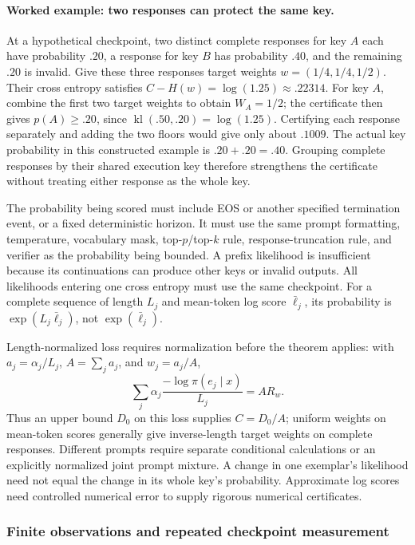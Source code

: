 \paragraph{Worked example: two responses can protect the same key.}
At a hypothetical checkpoint, two distinct complete responses for key $A$
each have probability $.20$, a response for key $B$ has probability $.40$,
and the remaining $.20$ is invalid. Give these three responses target weights
$w=(1/4,1/4,1/2)$. Their cross entropy satisfies
$C-H(w)=\log(1.25)\approx.22314$.
For key $A$, combine the first two target weights to obtain $W_A=1/2$;
the certificate then gives $p(A)\ge.20$, since
$\operatorname{kl}(.50,.20)=\log(1.25)$.
Certifying each response separately and adding the two floors would give only
about $.1009$. The actual key probability in this constructed example is
$.20+.20=.40$. Grouping complete responses by their shared execution key
therefore strengthens the certificate without treating either response as
the whole key.

The probability being scored must include EOS or another specified
termination event, or a fixed deterministic horizon. It must use the same
prompt formatting, temperature, vocabulary mask, top-$p$/top-$k$ rule,
response-truncation rule, and verifier as the probability being bounded.
A prefix likelihood is insufficient because its continuations can produce
other keys or invalid outputs. All likelihoods entering one cross entropy
must use the same checkpoint. For a complete sequence of length $L_j$ and
mean-token log score $\bar\ell_j$, its probability is
$\exp(L_j\bar\ell_j)$, not $\exp(\bar\ell_j)$.

Length-normalized loss requires normalization before the theorem applies:
with $a_j=\alpha_j/L_j$, $A=\sum_j a_j$, and $w_j=a_j/A$,
\[
 \sum_j\alpha_j\frac{-\log\pi(e_j\mid x)}{L_j}=A R_w.
\]
Thus an upper bound $D_0$ on this loss supplies $C=D_0/A$; uniform weights
on mean-token scores generally give inverse-length target weights on
complete responses. Different prompts require separate conditional
calculations or an explicitly normalized joint prompt mixture. A change
in one exemplar's likelihood need not equal the change in its whole key's
probability. Approximate log scores need controlled numerical error to
supply rigorous numerical certificates.

\subsubsection{Finite observations and repeated checkpoint measurement}

